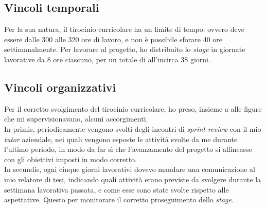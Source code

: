 \subsection{Vincoli temporali}\label{subsec:time-restrictions}\noindent
Per la sua natura, il tirocinio curricolare ha un limite di tempo: ovvero deve essere dalle 300 alle 320 ore di lavoro, e non è possibile sforare 40 ore settimanalmente.
Per lavorare al progetto, ho distribuito lo \textit{stage} in giornate lavorative da 8 ore ciascuno, per un totale di all'incirca 38 giorni.

\subsection{Vincoli organizzativi}\noindent
Per il corretto svolgimento del tirocinio curricolare, ho preso, insieme a alle figure che mi supervisionavano, alcuni accorgimenti.\\
In primis, periodicamente vengono svolti degli incontri di \textit{sprint review} con il mio \textit{tutor} aziendale, nei quali vengono esposte le attività svolte da me durante l'ultimo periodo, in modo da far sì che l'avanzamento del progetto si allineasse con gli obiettivi imposti in modo corretto.\\
In secundis, ogni cinque giorni lavorativi dovevo mandare una comunicazione al mio relatore di tesi, indicando quali attività erano previste da svolgere durante la settimana lavorativa passata, e come esse sono state svolte rispetto alle aspettative. Questo per monitorare il corretto proseguimento dello \textit{stage}.

